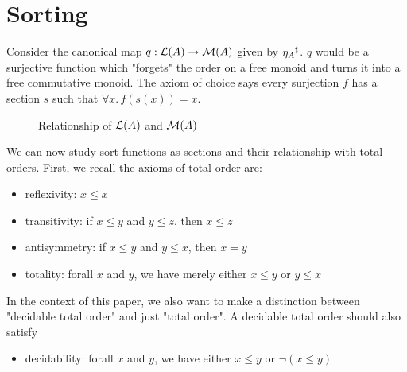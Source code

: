 \section{Sorting}
\label{sec:sorting}


Consider the canonical map $q : \mathcal{L}(A) \to \mathcal{M}(A)$ given by ${\eta_A}^{\sharp}$. $q$ would be a surjective
function which "forgets" the order on a free monoid and turns it into a free commutative monoid.
The axiom of choice says every surjection $f$ has a section $s$ such that $\forall x.\, f(s(x)) = x$.

\begin{figure}[H]
    \centering
    \caption{Relationship of $\mathcal{L}(A)$ and $\mathcal{M}(A)$}
    \label{fig:enter-label}
\end{figure}

We can now study sort functions as sections and their relationship with total orders.
First, we recall the axioms of total order are:
\begin{itemize}
    \item reflexivity: $x \leq x$
    \item transitivity: if $x \leq y$ and $y \leq z$, then $x \leq z$
    \item antisymmetry: if $x \leq y$ and $y \leq x$, then $x = y$
    \item totality: forall $x$ and $y$, we have merely either $x \leq y$ or $y \leq x$ 
\end{itemize}

In the context of this paper, we also want to make a distinction between "decidable total order"
and just "total order". A decidable total order should also satisfy
\begin{itemize}
    \item decidability: forall $x$ and $y$, we have either $x \leq y$ or $\neg(x \leq y)$ 
\end{itemize}

